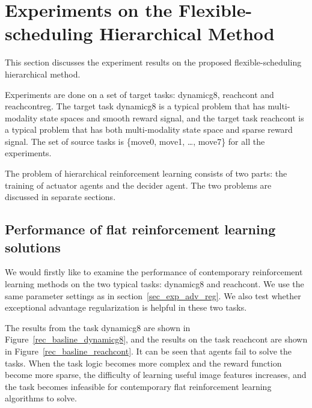 
\section{Experiments on the Flexible-scheduling Hierarchical Method}
This section discusses the experiment results on the proposed flexible-scheduling hierarchical method.

Experiments are done on a set of target tasks: dynamicg8, reachcont and reachcontreg. The target task dynamicg8 is a typical problem that has multi-modality state spaces and smooth reward signal, and the target task reachcont is a typical problem that has both multi-modality state space and sparse reward signal. The set of source tasks is  \{move0, move1, \dots, move7\} for all the experiments.

The problem of hierarchical reinforcement learning consists of two parts: the training of actuator agents and the decider agent. The two problems are discussed in separate sections.

\subsection{Performance of flat reinforcement learning solutions}
We would firstly like to examine the performance of contemporary reinforcement learning methods on the two typical tasks: dynamicg8 and reachcont. We use the same parameter settings as in section~\ref{sec_exp_adv_reg}. We also test whether exceptional advantage regularization is helpful in these two tasks.

The results from the task dynamicg8 are shown in Figure~\ref{rec_basline_dynamicg8}, and the results on the task reachcont are shown in Figure~\ref{rec_basline_reachcont}. It can be seen that agents fail to solve the tasks. When the task logic becomes more complex and the reward function become more sparse, the difficulty of learning useful image features increases, and the task becomes infeasible for contemporary flat reinforcement learning algorithms to solve.

